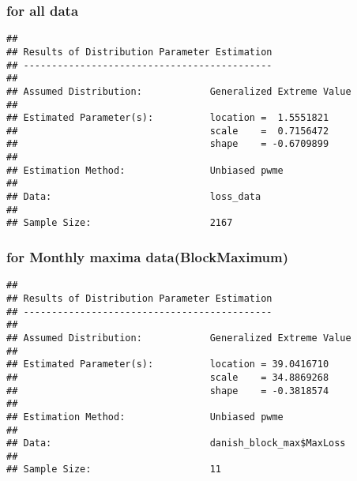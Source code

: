 \documentclass[
  12pt,
]{article}
\newenvironment{Shaded}{\begin{snugshade}}{\end{snugshade}}
\newcommand{\AttributeTok}[1]{\textcolor[rgb]{0.13,0.29,0.53}{#1}}
\newcommand{\CommentTok}[1]{\textcolor[rgb]{0.56,0.35,0.01}{\textit{#1}}}
\newcommand{\FunctionTok}[1]{\textcolor[rgb]{0.13,0.29,0.53}{\textbf{#1}}}
\newcommand{\NormalTok}[1]{#1}
\newcommand{\OtherTok}[1]{\textcolor[rgb]{0.56,0.35,0.01}{#1}}
\newcommand{\SpecialCharTok}[1]{\textcolor[rgb]{0.81,0.36,0.00}{\textbf{#1}}}
\newcommand{\StringTok}[1]{\textcolor[rgb]{0.31,0.60,0.02}{#1}}
\begin{document}
\subsubsection{for all data}\label{for-all-data-1}

\begin{Shaded}
\end{Shaded}

\begin{verbatim}
## 
## Results of Distribution Parameter Estimation
## --------------------------------------------
## 
## Assumed Distribution:            Generalized Extreme Value
## 
## Estimated Parameter(s):          location =  1.5551821
##                                  scale    =  0.7156472
##                                  shape    = -0.6709899
## 
## Estimation Method:               Unbiased pwme
## 
## Data:                            loss_data
## 
## Sample Size:                     2167
\end{verbatim}

\subsubsection{for Monthly maxima
data(BlockMaximum)}\label{for-monthly-maxima-datablockmaximum-1}

\begin{Shaded}
\end{Shaded}

\begin{verbatim}
## 
## Results of Distribution Parameter Estimation
## --------------------------------------------
## 
## Assumed Distribution:            Generalized Extreme Value
## 
## Estimated Parameter(s):          location = 39.0416710
##                                  scale    = 34.8869268
##                                  shape    = -0.3818574
## 
## Estimation Method:               Unbiased pwme
## 
## Data:                            danish_block_max$MaxLoss
## 
## Sample Size:                     11
\end{verbatim}
\end{document}
